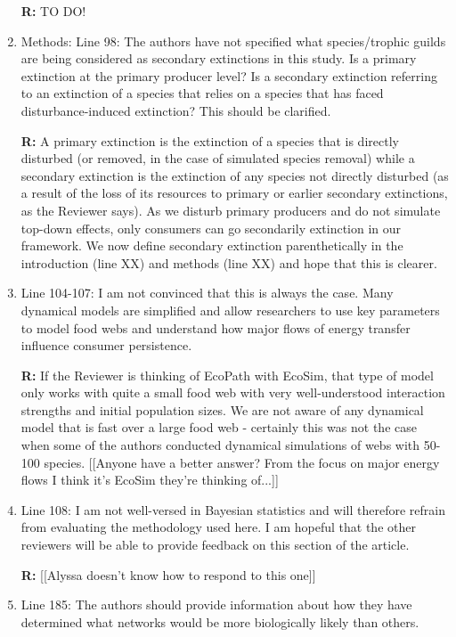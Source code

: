 \documentclass[12pt]{article}
\begin{document}
\begin{enumerate}
                \textbf{R:}
                TO DO!


            \item Methods: Line 98: The authors have not specified what species/trophic guilds are being considered as secondary extinctions in this study. Is a primary extinction at the primary producer level? Is a secondary extinction referring to an extinction of a species that relies on a species that has faced disturbance-induced extinction? This should be clarified.

                \textbf{R:} A primary extinction is the extinction of a species that is directly disturbed (or removed, in the case of simulated species removal) while a secondary extinction is the extinction of any species not directly disturbed (as a result of the loss of its resources to primary or earlier secondary extinctions, as the Reviewer says). As we disturb primary producers and do not simulate top-down effects, only consumers can go secondarily extinction in our framework. We now define secondary extinction parenthetically in the introduction (line XX) and methods (line XX) and hope that this is clearer. 


            \item Line 104-107: I am not convinced that this is always the case. Many dynamical models are simplified and allow researchers to use key parameters to model food webs and understand how major flows of energy transfer influence consumer persistence.

                \textbf{R:} If the Reviewer is thinking of EcoPath with EcoSim, that type of model only works with quite a small food web with very well-understood interaction strengths and initial population sizes. We are not aware of any dynamical model that is fast over a large food web - certainly this was not the case when some of the authors conducted dynamical simulations of webs with 50-100 species. [[Anyone have a better answer? From the focus on major energy flows I think it's EcoSim they're thinking of...]]


            \item Line 108: I am not well-versed in Bayesian statistics and will therefore refrain from evaluating the methodology used here. I am hopeful that the other reviewers will be able to provide feedback on this section of the article.

                \textbf{R:} [[Alyssa doesn't know how to respond to this one]]


            \item Line 185: The authors should provide information about how they have determined what networks would be more biologically likely than others.


\end{enumerate}
\end{document}
